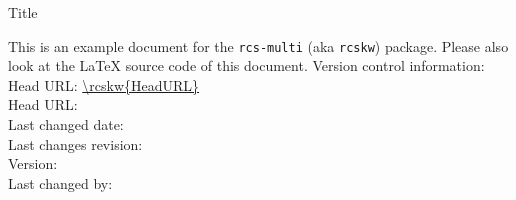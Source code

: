 \documentclass[12pt]{report}
\begin{document}
\begin{titlepage}
 \vspace{8ex}
 {\huge Title\par}
 \vspace{2ex}
 {\large \noindent This is an example document for the \texttt{rcs-multi} (aka
 \texttt{rcskw}) package. Please also look at the LaTeX source code of this
 document.}
 \vfill
 \flushleft\sffamily
 Version control information:\\
 Head URL: \url{\rcskw{HeadURL}}\\
 Head URL: \\
 Last changed date: \rcsdate\\
 Last changes revision: \rcsrev\\
 Version: \rcsFullRevision*{\rcsrev}\\
 Last changed by: \rcsFullAuthor*{\rcsauthor}\\
\end{titlepage}

\tableofcontents


%
%


%
\makeatletter

\makeatother
\end{document}
